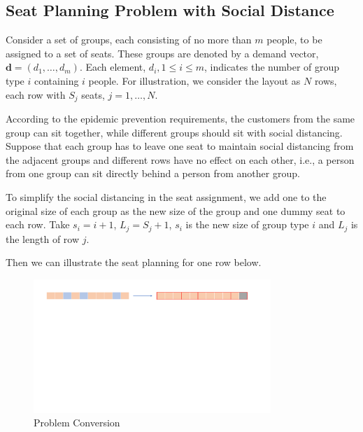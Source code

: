 \subsection{Seat Planning Problem with Social Distance}

Consider a set of groups, each consisting of no more than $m$ people, to be assigned to a set of seats. These groups are denoted by a demand vector, $\mathbf{d} = (d_1, \ldots, d_m)$. Each element, $d_i, 1 \leq i \leq m$, indicates the number of group type $i$ containing $i$ people. For illustration, we consider the layout as $N$ rows, each row with $S_{j}$ seats, $j = 1, \ldots, N$. 


According to the epidemic prevention requirements, the customers from the same group can sit together, while different groups should sit with social distancing. 
Suppose that each group has to leave one seat to maintain social distancing from the adjacent groups and different rows have no effect on each other, i.e., a person from one group can sit directly behind a person from another group.

To simplify the social distancing in the seat assignment, we add one to the original size of each group as the new size of the group and one dummy seat to each row. Take $s_{i} = i + 1$, $L_{j} = S_{j} +1$, $s_{i}$ is the new size of group type $i$ and $L_{j}$ is the length of row $j$.

Then we can illustrate the seat planning for one row below. 

\begin{figure}[ht]
    \centering
    \includegraphics[width = 0.8\textwidth]{./Figures/dummy_seat.pdf}
    \caption{Problem Conversion}
\end{figure}

